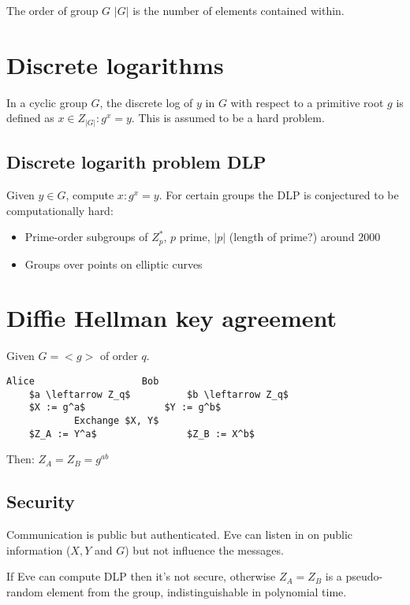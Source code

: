 \documentclass[a4paper]{scrreprt}
\begin{document}
The order of group $G$ $|G|$ is the number of elements contained within.

\section{Discrete logarithms}

In a cyclic group $G$, the discrete log of $y$ in $G$ with respect to a
primitive root $g$ is defined as $x \in Z_{|G|} : g^x = y$. This is assumed to
be a hard problem.

\subsection{Discrete logarith problem DLP}

Given $y \in G$, compute $x : g^x = y$. For certain groups the DLP is
conjectured to be computationally hard:

\begin{itemize}
	\item Prime-order subgroups of $Z^{*}_p$, $p$ prime, $|p|$ (length of
		prime?) around $2000$
	\item Groups over points on elliptic curves
\end{itemize}

\section{Diffie Hellman key agreement}

Given $G = <g>$ of order $q$.

\begin{lstlisting}[mathescape=true,autogobble=true]
	Alice					Bob
	$a \leftarrow Z_q$			$b \leftarrow Z_q$
	$X := g^a$				$Y := g^b$
			Exchange $X, Y$
	$Z_A := Y^a$				$Z_B := X^b$
\end{lstlisting}

Then: $Z_A = Z_B = g^{ab}$

\subsection{Security}

Communication is public but authenticated. Eve can listen in on public
information ($X, Y$ and $G$) but not influence the messages.

If Eve can compute DLP then it's not secure, otherwise $Z_A = Z_B$ is a
pseudo-random element from the group, indistinguishable in polynomial time.
\end{document}
